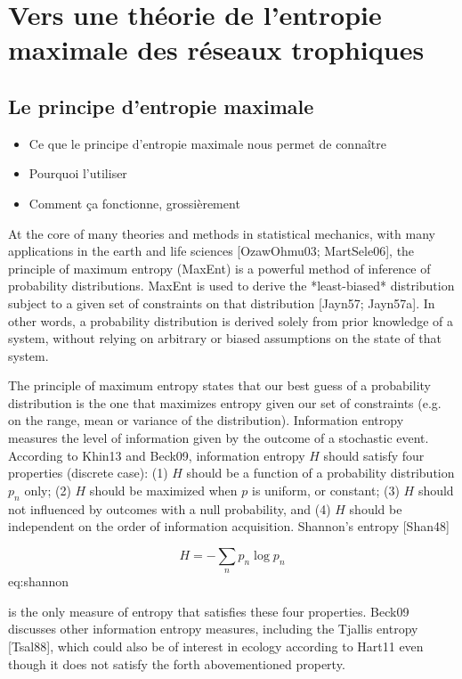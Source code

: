 
\section{Vers une théorie de l'entropie maximale des réseaux trophiques}

\subsection{Le principe d'entropie maximale} 

\begin{itemize}
    \item Ce que le principe d'entropie maximale nous permet de connaître
    \item Pourquoi l'utiliser
    \item Comment ça fonctionne, grossièrement
\end{itemize}

At the core of many theories and methods in statistical mechanics, with many
applications in the earth and life sciences [OzawOhmu03; MartSele06], the
principle of maximum entropy (MaxEnt) is a powerful method of inference of
probability distributions. MaxEnt is used to derive the *least-biased*
distribution subject to a given set of constraints on that distribution
[Jayn57; Jayn57a]. In other words, a probability distribution is derived
solely from prior knowledge of a system, without relying on arbitrary or biased
assumptions on the state of that system.

The principle of maximum entropy states that our best guess of a probability
distribution is the one that maximizes entropy given our set of constraints
(e.g. on the range, mean or variance of the distribution). Information entropy
measures the level of information given by the outcome of a stochastic event. According to
Khin13 and Beck09, information entropy $H$ should satisfy four properties
(discrete case): (1) $H$ should be a function of a probability distribution
$p_n$ only; (2) $H$ should be maximized when $p$ is uniform, or constant; (3)
$H$ should not influenced by outcomes with a null probability, and (4) $H$
should be independent on the order of information acquisition. Shannon's entropy
[Shan48]

$$H = -\sum_{n} p_n \log p_n$${eq:shannon}

is the only measure of entropy that satisfies these four properties. Beck09
discusses other information entropy measures, including the Tjallis entropy
[Tsal88], which could also be of interest in ecology according to Hart11 even
though it does not satisfy the forth abovementioned property.

